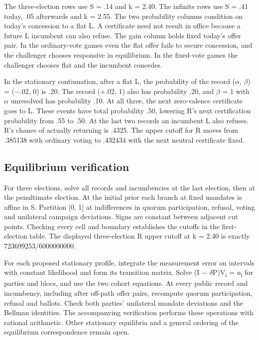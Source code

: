 \documentclass[11pt]{article}
\begin{document}
The three-election rows use S = .14 and k = 2.40. The infinite rows use S = .41 today, .05 afterwards and k = 2.55. The two probability columns condition on today's concession to a flat L. A certificate need not result in office because a future L incumbent can also refuse. The gain column holds fixed today's offer pair. In the ordinary-vote games even the flat offer fails to secure concession, and the challenger chooses responsive in equilibrium. In the fixed-vote games the challenger chooses flat and the incumbent concedes.

In the stationary continuation, after a flat L, the probability of the record ($\alpha$, $\beta$) = ($-$.02, 0) is .20. The record (+.02, 1) also has probability .20, and $\beta$ = 1 with $\alpha$ unresolved has probability .10. At all three, the next zero-valence certificate goes to L. These events have total probability .50, lowering R's next certification probability from .55 to .50. At the last two records an incumbent L also refuses. R's chance of actually returning is .4325. The upper cutoff for R moves from .385138 with ordinary voting to .432434 with the next neutral certificate fixed.

\subsection*{Equilibrium verification}

For three elections, solve all records and incumbencies at the last election, then at the penultimate election. At the initial prior each branch at fixed mandates is affine in S. Partition [0, 1] at indifferences in quorum participation, refusal, voting and unilateral campaign deviations. Signs are constant between adjacent cut points. Checking every cell and boundary establishes the cutoffs in the first-election table. The displayed three-election R upper cutoff at k = 2.40 is exactly 723699253/6000000000.

For each proposed stationary profile, integrate the measurement error on intervals with constant likelihood and form its transition matrix. Solve (I $-$ $\delta$P)V\textsubscript{i} = u\textsubscript{i} for parties and blocs, and use the two cohort equations. At every public record and incumbency, including after off-path offer pairs, recompute quorum participation, refusal and ballots. Check both parties' unilateral mandate deviations and the Bellman identities. The accompanying verification performs these operations with rational arithmetic. Other stationary equilibria and a general ordering of the equilibrium correspondence remain open.
\end{document}
